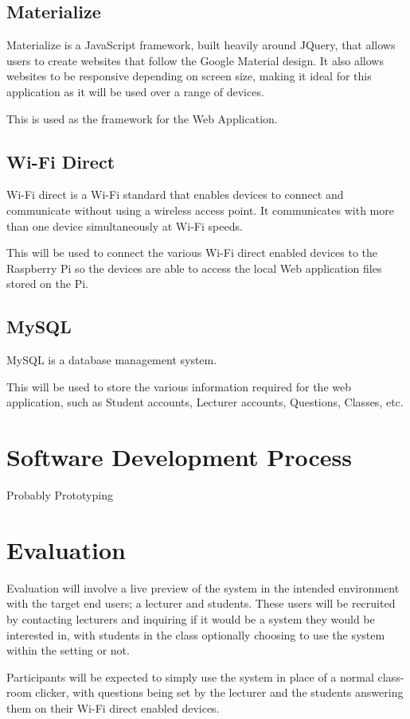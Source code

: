 \documentclass{article}
\begin{document}
\subsection{Materialize}
Materialize is a JavaScript framework, built heavily around JQuery, that allows users to create websites that follow the Google Material design. It also allows websites to be responsive depending on screen size, making it ideal for this application as it will be used over a range of devices.

This is used as the framework for the Web Application.

\subsection{Wi-Fi Direct}
Wi-Fi direct is a Wi-Fi standard that enables devices to connect and communicate without using a wireless access point. It communicates with more than one device simultaneously at Wi-Fi speeds.

This will be used to connect the various Wi-Fi direct enabled devices to the Raspberry Pi so the devices are able to access the local Web application files stored on the Pi.

\subsection{MySQL}
MySQL is a database management system. 

This will be used to store the various information required for the web application, such as Student accounts, Lecturer accounts, Questions, Classes, etc. 

\section{Software Development Process}
Probably Prototyping

\section{Evaluation}
Evaluation will involve a live preview of the system in the intended environment with the target end users; a lecturer and students. These users will be recruited by contacting lecturers and inquiring if it would be a system they would be interested in, with students in the class optionally choosing to use the system within the setting or not.

Participants will be expected to simply use the system in place of a normal class-room clicker, with questions being set by the lecturer and the students answering them on their Wi-Fi direct enabled devices. \\
\end{document}
